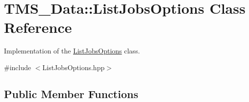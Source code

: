 \hypertarget{classTMS__Data_1_1ListJobsOptions}{
\section{TMS\_\-Data::ListJobsOptions Class Reference}
\label{classTMS__Data_1_1ListJobsOptions}
}


Implementation of the \hyperlink{classTMS__Data_1_1ListJobsOptions}{ListJobsOptions} class.  




{\ttfamily \#include $<$ListJobsOptions.hpp$>$}

\subsection*{Public Member Functions}
